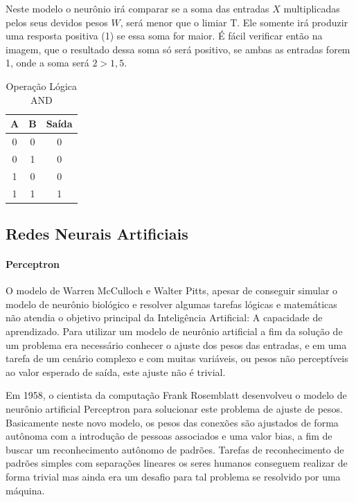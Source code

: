\documentclass[	12pt, Times, openright, twoside, a4paper, english, brazil]{abntex2}
\begin{document}
            Neste modelo o neurônio irá comparar se a soma das entradas $X$ multiplicadas pelos seus devidos pesos $W$, será menor que o limiar T. Ele somente irá produzir uma resposta positiva (1) se essa soma for maior. É fácil verificar então na imagem, que o resultado dessa soma só será positivo, se ambas as entradas forem 1, onde a soma será $2>1,5$.

            \begin{table}[!ht]
            \centering
            \caption{Operação Lógica AND} \label{tab:and}
              \begin{tabular}{|c|c|c|}
                  \hline  \textbf{A} & \textbf{B} &  \textbf{Saída}\\
                  \hline 0 & 0 & 0\\
                  \hline 0 & 1 & 0\\
                  \hline 1 & 0 & 0\\
                  \hline 1 & 1 & 1\\
                  \hline 
              \end{tabular}
            \end{table}

        \subsection{Redes Neurais Artificiais}
          \paragraph*{Perceptron}
            O modelo de Warren McCulloch e Walter Pitts, apesar de conseguir simular o modelo de neurônio biológico e resolver algumas tarefas lógicas e matemáticas não atendia o objetivo principal da Inteligência Artificial: A capacidade de aprendizado.
            Para utilizar um modelo de neurônio artificial a fim da solução de um problema era necessário conhecer o ajuste dos pesos das entradas, e em uma tarefa de um cenário complexo e com muitas variáveis, ou pesos não perceptíveis ao valor esperado de saída, este ajuste não é trivial.
            
            Em 1958, o cientista da computação Frank Rosemblatt desenvolveu o modelo de neurônio artificial Perceptron para solucionar este problema de ajuste de pesos.
            Basicamente neste novo modelo, os pesos das conexões são ajustados de forma autônoma com a introdução de pessoas associados e uma valor bias, a fim de buscar um reconhecimento autônomo de padrões. Tarefas de reconhecimento de padrões simples com separações lineares os seres humanos conseguem realizar de forma trivial mas ainda era um desafio para tal problema se resolvido por uma máquina.
\end{document}
